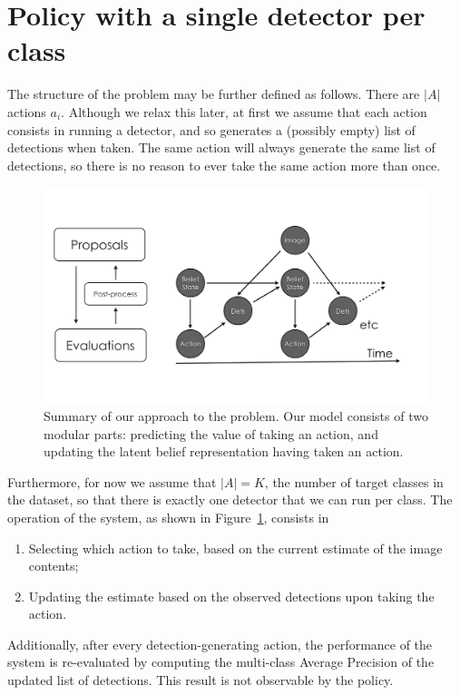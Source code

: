 \section{Policy with a single detector per class}
The structure of the problem may be further defined as follows.
There are $|A|$ actions $a_i$.
Although we relax this later, at first we assume that each action consists in running a detector, and so generates a (possibly empty) list of detections when taken.
The same action will always generate the same list of detections, so there is no reason to ever take the same action more than once.

\begin{figure}[htb!]
  \centering
    \includegraphics[width=0.9\linewidth]{../figures/pomdp.pdf}
  \caption{Summary of our approach to the problem. Our model consists of two modular parts: predicting the value of taking an action, and updating the latent belief representation having taken an action.}
  \label{fig:pomdp}
\end{figure}

Furthermore, for now we assume that $|A|=K$, the number of target classes in the dataset, so that there is exactly one detector that we can run per class.
The operation of the system, as shown in Figure~\ref{fig:pomdp}, consists in
\begin{enumerate}
\item Selecting which action to take, based on the current estimate of the image contents;
\item Updating the estimate based on the observed detections upon taking the action.
\end{enumerate}

Additionally, after every detection-generating action, the performance of the system is re-evaluated by computing the multi-class Average Precision of the updated list of detections.
This result is not observable by the policy.

